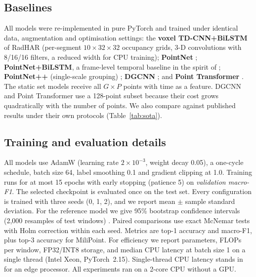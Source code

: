 \subsection{Baselines}
All models were re-implemented in pure PyTorch and trained under identical data,
augmentation and optimisation settings:
the \textbf{voxel TD-CNN+BiLSTM} of RadHAR \cite{singh2019radhar} (per-segment
$10\times32\times32$ occupancy grids, 3-D convolutions with 8/16/16 filters, a
reduced width for CPU training);
\textbf{PointNet} \cite{qi2017pointnet};
\textbf{PointNet+BiLSTM}, a frame-level temporal baseline in the spirit of
\cite{gu2024lpn};
\textbf{PointNet++} (single-scale grouping) \cite{qi2017pointnet2};
\textbf{DGCNN} \cite{wang2019dgcnn};
and \textbf{Point Transformer} \cite{zhao2021pt}.
The static set models receive all $G\!\times\!P$ points with time as a feature.
DGCNN and Point Transformer use a 128-point subset because their cost grows
quadratically with the number of points. We also compare against published
results under their own protocols (Table~\ref{tab:sota}).

\subsection{Training and evaluation details}
All models use AdamW \cite{loshchilov2019adamw} (learning rate
$2\!\times\!10^{-3}$, weight decay 0.05), a one-cycle schedule, batch size 64,
label smoothing 0.1 and gradient clipping at 1.0. Training runs for at most 15
epochs with early stopping (patience 5) on \emph{validation macro-F1}. The
selected checkpoint is evaluated once on the test set. Every configuration is
trained with three seeds (0, 1, 2), and we report mean $\pm$ sample standard
deviation. For the reference model we give 95\% bootstrap confidence intervals
(2{,}000 resamples of test windows) \cite{efron1979bootstrap}. Paired
comparisons use exact McNemar tests \cite{mcnemar1947} with Holm correction
\cite{holm1979} within each seed. Metrics are top-1 accuracy and macro-F1, plus
top-3 accuracy for MiliPoint. For efficiency we report parameters, FLOPs per
window, FP32/INT8 storage, and median CPU latency at batch size 1 on a single
thread (Intel Xeon, PyTorch~2.15). Single-thread CPU latency stands in for an
edge processor. All experiments ran on a 2-core CPU without a GPU.
